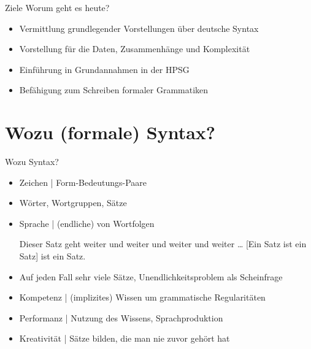 
\begin{frame}
  {Ziele}
  \onslide<+->
  \onslide<+->
  Worum geht es heute?\\
  \Zeile
  \begin{itemize}[<+->]
    \item Vermittlung grundlegender Vorstellungen über deutsche Syntax
    \item Vorstellung für die Daten, Zusammenhänge und Komplexität
    \item Einführung in Grundannahmen in der HPSG
    \item Befähigung zum Schreiben formaler Grammatiken
  \end{itemize}
  \Zeile
  \centering
  \onslide<+->
\end{frame}



\section{Wozu (formale) Syntax?}

\begin{frame}
  {Wozu Syntax?}
  \onslide<+->
  \begin{itemize}[<+->]
    \item \alert{Zeichen} | Form-Bedeutungs-Paare \citep{Saussure16a-Fr}
    \item Wörter, Wortgruppen, Sätze
    \item Sprache |  (endliche)  von Wortfolgen\\
      \begin{exe}
        \ex Dieser Satz geht weiter und weiter und weiter und weiter \ldots
        \ex {}[Ein Satz ist ein Satz] ist ein Satz.
      \end{exe}
      \Halbzeile
    \item Auf jeden Fall \alert{sehr viele Sätze}, Unendlichkeitsproblem als Scheinfrage
    \item \alert{Kompetenz} | (implizites) Wissen um grammatische Regularitäten
    \item \alert{Performanz} | Nutzung des Wissens, Sprachproduktion
      \Halbzeile
    \item \alert{Kreativität} | Sätze bilden, die man nie zuvor gehört hat
  \end{itemize}
\end{frame}
 
